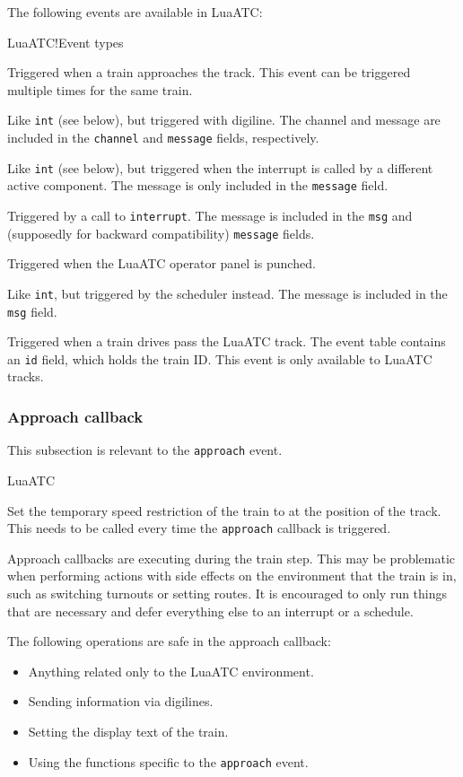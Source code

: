 The following events are available in LuaATC:
\begin{apidoc}{LuaATC!Event types}
\item {} Triggered when a train approaches the track. This event can be triggered multiple times for the same train.
\item {} Like \texttt{int} (see below), but triggered with digiline. The channel and message are included in the \texttt{channel} and \texttt{message} fields, respectively.
\item {} Like \texttt{int} (see below), but triggered when the interrupt is called by a different active component. The message is only included in the \texttt{message} field.
\item {} Triggered by a call to \texttt{interrupt}. The message is included in the \texttt{msg} and (supposedly for backward compatibility) \texttt{message} fields.
\item {} Triggered when the LuaATC operator panel is punched.
\item {} Like \texttt{int}, but triggered by the scheduler instead. The message is included in the \texttt{msg} field.
\item {} Triggered when a train drives pass the LuaATC track. The event table contains an \texttt{id} field, which holds the train ID. This event is only available to LuaATC tracks.
\end{apidoc}

\subsubsection{Approach callback}
This subsection is relevant to the \texttt{approach} event.
\begin{apidoc}{LuaATC}
\item {} Set the temporary speed restriction of the train to  at the position of the track. This needs to be called every time the \texttt{approach} callback is triggered.
\end{apidoc}
Approach callbacks are executing during the train step. This may be problematic when performing actions with side effects on the environment that the train is in, such as switching turnouts or setting routes. It is encouraged to only run things that are necessary and defer everything else to an interrupt or a schedule.

The following operations are safe in the approach callback:
\begin{itemize}
\item Anything related only to the LuaATC environment.
\item Sending information via digilines.
\item Setting the display text of the train.
\item Using the functions specific to the \texttt{approach} event.
\end{itemize}

